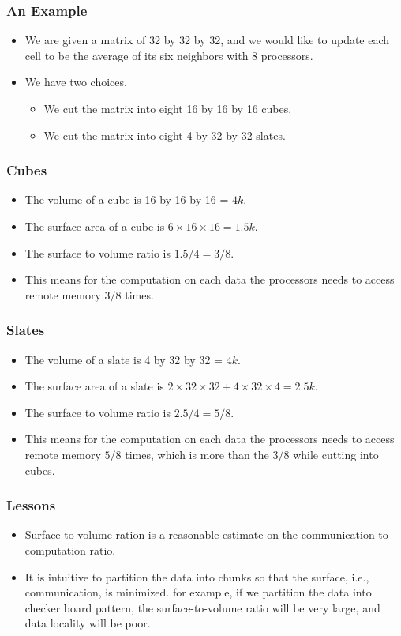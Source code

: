\documentclass{beamer}
\begin{document}
\begin{CJK}{UTF8}{bsmi}
\begin{frame}
\frametitle{An Example}
\begin{itemize}
\item We are given a matrix of 32 by 32 by 32, and we would like to
  update each cell to be the average of its six neighbors with 8
  processors.
\item We have two choices.
\begin{itemize}
\item We cut the matrix into eight 16 by 16 by 16 cubes.
\item We cut the matrix into eight 4 by 32 by 32 slates.
\end{itemize}
\end{itemize}
\end{frame}

\begin{frame}
\frametitle{Cubes}
\begin{itemize}
\item The volume of a cube is 16 by 16 by 16 = $4k$.
\item The surface area of a cube is $6 \times 16 \times 16 = 1.5k$.
\item The surface to volume ratio is $1.5/4 = 3/8$.
\item This means for the computation on each data the processors needs
  to access remote memory $3/8$ times.
\end{itemize}
\end{frame}

\begin{frame}
\frametitle{Slates}
\begin{itemize}
\item The volume of a slate is 4 by 32 by 32 = $4k$.
\item The surface area of a slate is $2 \times 32 \times 32 + 4 \times
  32 \times 4 = 2.5k$.
\item The surface to volume ratio is $2.5/4 = 5/8$.
\item This means for the computation on each data the processors needs
  to access remote memory $5/8$ times, which is more than the $3/8$
  while cutting into cubes.
\end{itemize}
\end{frame}

\begin{frame}
\frametitle{Lessons}
\begin{itemize}
\item Surface-to-volume ration is a reasonable estimate on the
  communication-to-computation ratio.
\item It is intuitive to partition the data into chunks so that the
  surface, i.e., communication, is minimized.  for example, if we
  partition the data into checker board pattern, the surface-to-volume
  ratio will be very large, and data locality will be poor.
\end{itemize}
\end{frame}



\end{CJK}
\end{document}
